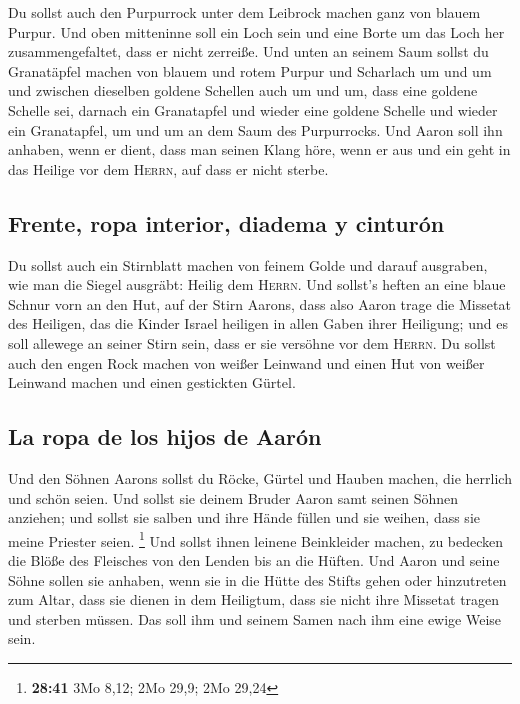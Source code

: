  Du sollst auch den Purpurrock unter dem Leibrock machen
ganz von blauem Purpur.  Und oben mitteninne soll ein
Loch sein und eine Borte um das Loch her zusammengefaltet, dass er nicht
zerreiße.  Und unten an seinem Saum sollst du Granatäpfel
machen von blauem und rotem Purpur und Scharlach um und um und zwischen
dieselben goldene Schellen auch um und um,  dass eine
goldene Schelle sei, darnach ein Granatapfel und wieder eine goldene
Schelle und wieder ein Granatapfel, um und um an dem Saum des
Purpurrocks.  Und Aaron soll ihn anhaben, wenn er dient,
dass man seinen Klang höre, wenn er aus und ein geht in das Heilige vor
dem \textsc{Herrn}, auf dass er nicht sterbe.

\hypertarget{frente-ropa-interior-diadema-y-cinturuxf3n}{%
\subsection{Frente, ropa interior, diadema y
cinturón}\label{frente-ropa-interior-diadema-y-cinturuxf3n}}

 Du sollst auch ein Stirnblatt machen von feinem Golde
und darauf ausgraben, wie man die Siegel ausgräbt: Heilig dem
\textsc{Herrn}.  Und sollst's heften an eine blaue Schnur
vorn an den Hut,  auf der Stirn Aarons, dass also Aaron
trage die Missetat des Heiligen, das die Kinder Israel heiligen in allen
Gaben ihrer Heiligung; und es soll allewege an seiner Stirn sein, dass
er sie versöhne vor dem \textsc{Herrn}.  Du sollst auch
den engen Rock machen von weißer Leinwand und einen Hut von weißer
Leinwand machen und einen gestickten Gürtel.

\hypertarget{la-ropa-de-los-hijos-de-aaruxf3n}{%
\subsection{La ropa de los hijos de
Aarón}\label{la-ropa-de-los-hijos-de-aaruxf3n}}

 Und den Söhnen Aarons sollst du Röcke, Gürtel und Hauben
machen, die herrlich und schön seien.  Und sollst sie
deinem Bruder Aaron samt seinen Söhnen anziehen; und sollst sie salben
und ihre Hände füllen und sie weihen, dass sie meine Priester seien.
\footnote{\textbf{28:41} 3Mo 8,12; 2Mo 29,9; 2Mo 29,24} 
Und sollst ihnen leinene Beinkleider machen, zu bedecken die Blöße des
Fleisches von den Lenden bis an die Hüften.  Und Aaron
und seine Söhne sollen sie anhaben, wenn sie in die Hütte des Stifts
gehen oder hinzutreten zum Altar, dass sie dienen in dem Heiligtum, dass
sie nicht ihre Missetat tragen und sterben müssen. Das soll ihm und
seinem Samen nach ihm eine ewige Weise sein.

